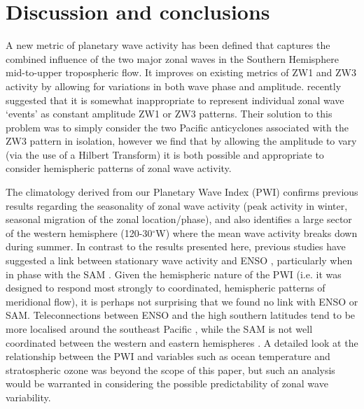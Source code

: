\section{Discussion and conclusions}

A new metric of planetary wave activity has been defined that captures the combined influence of the two major zonal waves in the Southern Hemisphere mid-to-upper tropospheric flow. It improves on existing metrics of ZW1 and ZW3 activity by allowing for variations in both wave phase and amplitude. \citet{Hobbs2010} recently suggested that it is somewhat inappropriate to represent individual zonal wave `events' as constant amplitude ZW1 or ZW3 patterns. Their solution to this problem was to simply consider the two Pacific anticyclones associated with the ZW3 pattern in isolation, however we find that by allowing the amplitude to vary (via the use of a Hilbert Transform) it is both possible and appropriate to consider hemispheric patterns of zonal wave activity.  

The climatology derived from our Planetary Wave Index (PWI) confirms previous results regarding the seasonality of zonal wave activity (peak activity in winter, seasonal migration of the zonal location/phase), and also identifies a large sector of the western hemisphere (120-30$^{\circ}$W) where the mean wave activity breaks down during summer. In contrast to the results presented here, previous studies have suggested a link between stationary wave activity and ENSO \citep[e.g.][]{Trenberth1980,Raphael2003,Hobbs2007}, particularly when in phase with the SAM \citep{Pezza2012}. Given the hemispheric nature of the PWI (i.e. it was designed to respond most strongly to coordinated, hemispheric patterns of meridional flow), it is perhaps not surprising that we found no link with ENSO or SAM. Teleconnections between ENSO and the high southern latitudes tend to be more localised around the southeast Pacific \citep{Turner2004}, while the SAM is not well coordinated between the western and eastern hemispheres \citep{Ding2012}. A detailed look at the relationship between the PWI and variables such as ocean temperature and stratospheric ozone was beyond the scope of this paper, but such an analysis would be warranted in considering the possible predictability of zonal wave variability.

